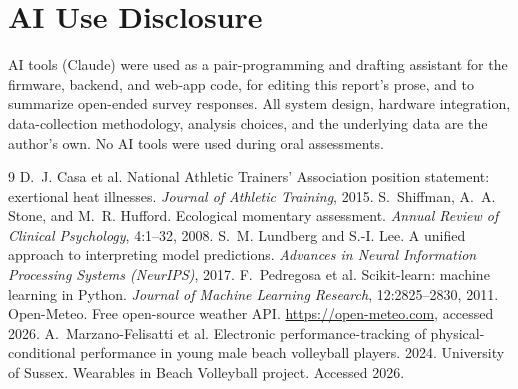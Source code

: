 \documentclass[sigconf,nonacm]{acmart}
\begin{document}
\section*{AI Use Disclosure}
AI tools (Claude) were used as a pair-programming and drafting assistant for the firmware, backend, and web-app code, for editing this report's prose, and to summarize open-ended survey responses. All system design, hardware integration, data-collection methodology, analysis choices, and the underlying data are the author's own. No AI tools were used during oral assessments.

\begin{thebibliography}{9}
 D.~J. Casa et al. National Athletic Trainers' Association position statement: exertional heat illnesses. \emph{Journal of Athletic Training}, 2015.
 S.~Shiffman, A.~A. Stone, and M.~R. Hufford. Ecological momentary assessment. \emph{Annual Review of Clinical Psychology}, 4:1--32, 2008.
 S.~M. Lundberg and S.-I. Lee. A unified approach to interpreting model predictions. \emph{Advances in Neural Information Processing Systems (NeurIPS)}, 2017.
 F.~Pedregosa et al. Scikit-learn: machine learning in Python. \emph{Journal of Machine Learning Research}, 12:2825--2830, 2011.
 Open-Meteo. Free open-source weather API. \url{https://open-meteo.com}, accessed 2026.
 A.~Marzano-Felisatti et al. Electronic performance-tracking of physical-conditional performance in young male beach volleyball players. 2024.
 University of Sussex. Wearables in Beach Volleyball project. Accessed 2026.
\end{thebibliography}
\end{document}
